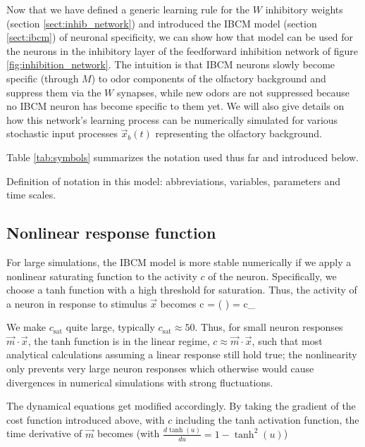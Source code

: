 Now that we have defined a generic learning rule for the $W$ inhibitory weights (section \ref{sect:inhib_network}) and introduced the IBCM model (section \ref{sect:ibcm}) of neuronal specificity, we can show how that model can be used for the neurons in the inhibitory layer of the feedforward inhibition network of figure \ref{fig:inhibition_network}. The intuition is that IBCM neurons slowly become specific (through $M$) to odor components of the olfactory background and suppress them via the $W$ synapses, while new odors are not suppressed because no IBCM neuron has become specific to them yet. We will also give details on how this network's learning process can be numerically simulated for various stochastic input processes $\vec{x}_b(t)$ representing the olfactory background. 

Table \ref{tab:symbols} summarizes the notation used thus far and introduced below. 

\begin{table}[p]
\centering

\caption{Definition of notation in this model: abbreviations, variables, parameters and time scales. }
\label{tab:symbols}
\end{table}


\subsection{Nonlinear response function}
\label{subsect:nonlinear_neuron}
For large simulations, the IBCM model is more stable numerically if we apply a nonlinear saturating function to the activity $c$ of the neuron. Specifically, we choose a tanh function with a high threshold for saturation. Thus, the activity of a neuron in response to stimulus $\vec{x}$ becomes
\beq
c = \sigma( \cdot {}) = c_{} 
\label{eq:nonlinear_neuron}
\eeq

We make $c_{\mathrm{sat}}$ quite large, typically $c_{\mathrm{sat}} \approx 50$. Thus, for small neuron responses $\vec{m} \cdot \vec{x}$, the tanh function is in the linear regime, $c \approx \vec{m} \cdot \vec{x}$, such that most analytical calculations assuming a linear response still hold true; the nonlinearity only prevents very large neuron responses which otherwise would cause divergences in numerical simulations with strong fluctuations. 

The dynamical equations get modified accordingly. By taking the gradient of the cost function introduced above, with $c$ including the tanh activation function, the time derivative of $\vec{m}$ becomes (with $\frac{d \tanh(u)}{du} = 1 - \tanh^2(u)$)

